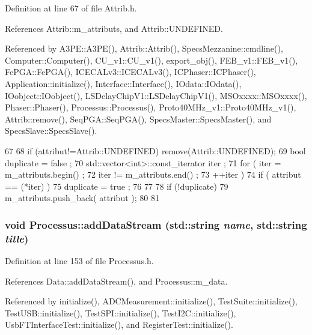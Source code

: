 Definition at line 67 of file Attrib.h.

References Attrib::m\_\-attributs, and Attrib::UNDEFINED.

Referenced by A3PE::A3PE(), Attrib::Attrib(), SpecsMezzanine::cmdline(), Computer::Computer(), CU\_\-v1::CU\_\-v1(), export\_\-obj(), FEB\_\-v1::FEB\_\-v1(), FePGA::FePGA(), ICECALv3::ICECALv3(), ICPhaser::ICPhaser(), Application::initialize(), Interface::Interface(), IOdata::IOdata(), IOobject::IOobject(), LSDelayChipV1::LSDelayChipV1(), MSOxxxx::MSOxxxx(), Phaser::Phaser(), Processus::Processus(), Proto40MHz\_\-v1::Proto40MHz\_\-v1(), Attrib::remove(), SeqPGA::SeqPGA(), SpecsMaster::SpecsMaster(), and SpecsSlave::SpecsSlave().


\begin{DoxyCode}
67                             {
68     if (attribut!=Attrib::UNDEFINED) remove(Attrib::UNDEFINED);
69     bool duplicate = false ;
70     std::vector<int>::const_iterator iter ;
71     for ( iter  = m_attributs.begin() ;
72           iter != m_attributs.end()   ;
73           ++iter ) {
74       if ( attribut == (*iter) ) {
75         duplicate = true ;
76       }
77     }
78     if (!duplicate) {
79       m_attributs.push_back( attribut );
80     }
81   }
\end{DoxyCode}
\hypertarget{classProcessus_a308c8f193802f1d1ab49d4447d0cb281}{
\subsubsection[{addDataStream}]{\setlength{\rightskip}{0pt plus 5cm}void Processus::addDataStream (std::string {\em name}, \/  std::string {\em title})}}
\label{classProcessus_a308c8f193802f1d1ab49d4447d0cb281}


Definition at line 153 of file Processus.h.

References Data::addDataStream(), and Processus::m\_\-data.

Referenced by initialize(), ADCMeasurement::initialize(), TestSuite::initialize(), TestUSB::initialize(), TestSPI::initialize(), TestI2C::initialize(), UsbFTInterfaceTest::initialize(), and RegisterTest::initialize().


